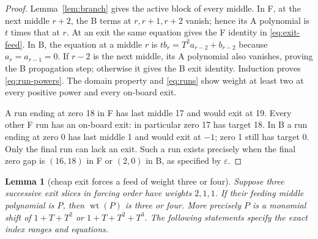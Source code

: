 \documentclass{article}
\newtheorem{lemma}{Lemma}
\DeclareMathOperator{\wt}{wt}
\begin{document}
\begin{proof}
  Lemma~\ref{lem:branch} gives the active block of every middle. In F, at the next middle
  \(r + 2\), the B terms at \(r, r + 1, r + 2\) vanish; hence its A polynomial is \(t\) times that
  at \(r\). At an exit the same equation gives the F identity in \eqref{eq:exit-feed}. In B, the
  equation at a middle \(r\) is \(t b_r = T^2 a_{r-2} + b_{r-2}\) because \(a_r = a_{r-1} = 0\). If
  \(r - 2\) is the next middle, its A polynomial also vanishes, proving the B propagation step;
  otherwise it gives the B exit identity. Induction proves \eqref{eq:run-powers}. The domain
  property and \eqref{eq:runs} show weight at least two at every positive power and every on-board
  exit.

  A run ending at zero 18 in F has last middle 17 and would exit at 19. Every other F run has an
  on-board exit: in particular zero 17 has target 18. In B a run ending at zero 0 has last middle 1
  and would exit at \(-1\); zero 1 still has target 0. Only the final run can lack an exit. Such a
  run exists precisely when the final zero gap is \((16,18)\) in F or \((2,0)\) in B, as specified
  by \(\varepsilon\).
\end{proof}

\begin{lemma}[cheap exit forces a feed of weight three or four]\label{lem:cheap-exit}
  Suppose three successive exit slices in forcing order have weights \(2, 1, 1\). If their feeding
  middle polynomial is \(P\), then \(\wt(P)\) is three or four. More precisely \(P\) is a monomial
  shift of \(1 + T + T^2\) or \(1 + T + T^2 + T^3\). The following statements specify the exact
  index ranges and equations.
\end{lemma}
\end{document}
